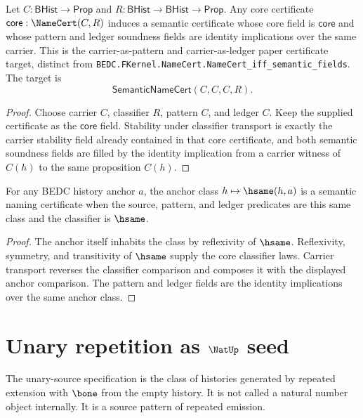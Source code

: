\begin{theorem}
\label{thm:namecert-carrier-self-semantic-lifting}
Let $C : \mathsf{BHist}\to\mathsf{Prop}$ and
$R : \mathsf{BHist}\to\mathsf{BHist}\to\mathsf{Prop}$. Any core certificate
$\mathsf{core}:\NameCert(C,R)$ induces a semantic certificate whose core field is
$\mathsf{core}$ and whose pattern and ledger soundness fields are identity
implications over the same carrier. This is the carrier-as-pattern and
carrier-as-ledger paper certificate target, distinct from
\texttt{BEDC.FKernel.NameCert.NameCert\_iff\_semantic\_fields}. The target is
$$
\mathsf{SemanticNameCert}(C,C,C,R).
$$
\end{theorem}
\begin{proof}
Choose carrier $C$, classifier $R$, pattern $C$, and ledger $C$. Keep the
supplied certificate as the $\mathsf{core}$ field. Stability under classifier
transport is exactly the carrier stability field already contained in that core
certificate, and both semantic soundness fields are filled by the identity
implication from a carrier witness of $C(h)$ to the same proposition $C(h)$.
\end{proof}

\begin{theorem}
\label{thm:eqtype-class-semantic-namecert}
For any BEDC history anchor $a$, the anchor class
$h\mapsto \hsame(h,a)$ is a semantic naming certificate when the source,
pattern, and ledger predicates are this same class and the classifier is
$\hsame$.
\end{theorem}
\begin{proof}
The anchor itself inhabits the class by reflexivity of $\hsame$. Reflexivity,
symmetry, and transitivity of $\hsame$ supply the core classifier laws.
Carrier transport reverses the classifier comparison and composes it with the
displayed anchor comparison. The pattern and ledger fields are the identity
implications over the same anchor class.
\end{proof}

\section{Unary repetition as \texorpdfstring{\(\NatUp\)}{Nat-up} seed}

\begin{definition}
\label{def:unary-source-specification-hardening}
The unary-source specification is the class of histories generated by repeated extension with \(\bone\) from the empty history. It is not called a natural number object internally. It is a source pattern of repeated emission.
\end{definition}


